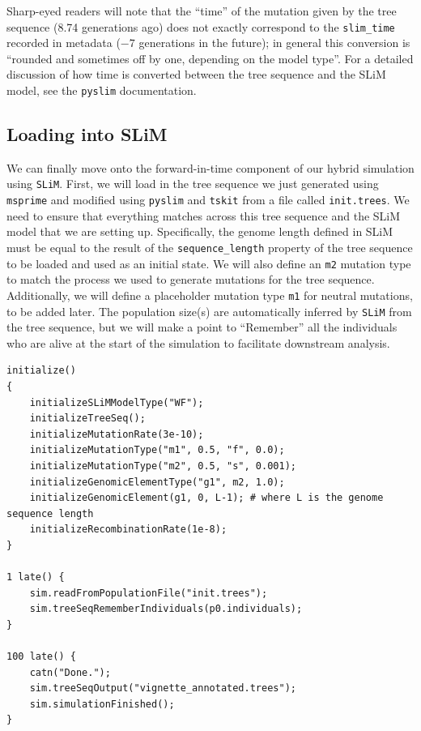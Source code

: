 \documentclass[12pt]{article}
\newcommand{\msprime}[0]{\texttt{msprime}\xspace}
\newcommand{\tskit}[0]{\texttt{tskit}\xspace}
\newcommand{\slim}[0]{\texttt{SLiM}\xspace}
\newcommand{\pyslim}[0]{\texttt{pyslim}\xspace}
\begin{document}
Sharp-eyed readers will note that the ``time'' of the mutation given by the tree sequence (8.74 generations ago) does not exactly
correspond to the \verb|slim_time| recorded in metadata ($-7$ generations in the future); in general this conversion is ``rounded and sometimes
off by one, depending on the model type''. For a detailed discussion of how time is converted between the tree sequence and the SLiM
model, see the \pyslim documentation.

\subsection*{Loading into SLiM}

We can finally move onto the forward-in-time component of our hybrid simulation using \slim. First, we will load in the tree sequence we just
generated using \msprime and modified using \pyslim and \tskit from a file called \verb|init.trees|. We need to ensure that everything matches
across this tree sequence and the SLiM model that we are setting up. Specifically, the genome length defined in SLiM must be equal to the
result of the \verb|sequence_length| property of the tree sequence to be loaded and used as an initial state. We will also define an \verb|m2|
mutation type to match the process we used to generate mutations for the tree sequence. Additionally, we will define a placeholder mutation
type \verb|m1| for neutral mutations, to be added later. The population size(s) are automatically inferred by \slim from the tree sequence,
but we will make a point to ``Remember'' all the individuals who are alive at the start of the simulation to facilitate downstream analysis.

\begin{verbatim}
initialize()
{
    initializeSLiMModelType("WF");
    initializeTreeSeq();
    initializeMutationRate(3e-10);
    initializeMutationType("m1", 0.5, "f", 0.0);
    initializeMutationType("m2", 0.5, "s", 0.001);
    initializeGenomicElementType("g1", m2, 1.0);
    initializeGenomicElement(g1, 0, L-1); # where L is the genome sequence length
    initializeRecombinationRate(1e-8);
}

1 late() { 
    sim.readFromPopulationFile("init.trees");
    sim.treeSeqRememberIndividuals(p0.individuals);
}

100 late() {
    catn("Done.");
    sim.treeSeqOutput("vignette_annotated.trees");
    sim.simulationFinished();
}
\end{verbatim}
\end{document}
